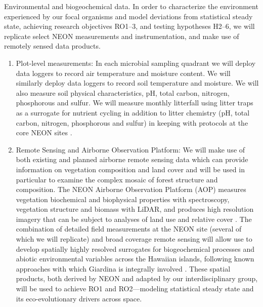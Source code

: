 \documentclass[11pt]{article}
\makeatletter
\renewcommand{\paragraph}{\@startsection{paragraph}{4}{\z@}
  {1ex \@plus 1ex \@minus .2ex}{-1em}
  {\normalfont\normalsize\it}
}
\makeatother
\begin{document}
\paragraph{Environmental and biogeochemical data.}
In order to characterize the environment experienced by our focal
organisms and model deviations from statistical steady state,
achieving research objectives RO1--3, and testing hypotheses H2--6, we
will replicate select NEON measurements and instrumentation, and make
use of remotely sensed data products.

\begin{enumerate}
\item Plot-level measurements: In each microbial sampling quadrant we
  will deploy data loggers to record air temperature and moisture
  content.  We will similarly deploy data loggers to record soil
  temperature and moisture.  We will also measure soil physical
  characteristics, pH, total carbon, nitrogen, phosphorous and sulfur.
  We will measure monthly litterfall using litter traps as a surrogate
  for nutrient cycling \citep{austin2000, giardina2004} in addition to
  litter chemistry (pH, total carbon, nitrogen, phosphorous and
  sulfur) in keeping with protocols at the core NEON sites \citep{NEON}.
\item Remote Sensing and Airborne Observation Platform: We will make
  use of both existing \citep[e.g.,][]{asner2006, asner2016} and
  planned airborne remote sensing data which can provide information
  on vegetation composition and land cover and will be used in
  particular to examine the complex mosaic of forest structure and
  composition. The NEON Airborne Observation Platform (AOP) measures
  vegetation biochemical and biophysical properties with spectroscopy,
  vegetation structure and biomass with LiDAR, and produces high
  resolution imagery that can be subject to analyses of land use and
  relative cover \citep{NEON}. The combination of detailed field
  measurements at the NEON site (several of which we will replicate)
  and broad coverage remote sensing will allow use to develop
  spatially highly resolved surrogates for biogeochemical processes
  and abiotic environmental variables across the Hawaiian islands,
  following known approaches with which Giardina is integrally
  involved \citep[e.g.,][]{broadbent2014, asner2016}.  These spatial
  products, both derived by NEON and adapted by our interdisciplinary
  group, will be used to achieve RO1 and RO2---modeling statistical
  steady state and its eco-evolutionary drivers across space.
\end{enumerate}
\end{document}
